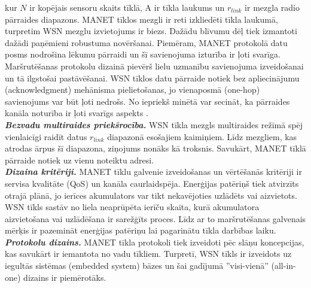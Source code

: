 kur $N$ ir kopējais sensoru skaits tīklā, A ir tīkla laukums un $r_{link}$ ir mezgla radio pārraides diapazons. MANET tīklos mezgli ir reti izkliedēti tīkla laukumā, turpretim WSN mezglu izvietojums ir biezs. Dažādu blīvumu dēļ tiek izmantoti dažādi paņēmieni robustuma novēršanai. Piemēram, MANET protokolā datu posms nodrošina lēkumu pārraidi un šī savienojuma izturība ir ļoti svarīga. Maršrutēšanas protokolu dizainā pievērš lielu uzmanību savienojuma izveidošanai un tā ilgstošai pastāvēšanai. WSN tīklos datu pārraide notiek bez apliecinājumu (acknowledgment) mehānisma pielietošanas, jo vienaposmā (one-hop) savienojums var būt ļoti nedrošs. No iepriekš minētā var secināt, ka pārraides kanāla noturība ir ļoti svarīgs aspekts \cite{20}.\\
\small\textbf{\textit{Bezvadu multiraides priekšrocība.}} WSN tīkla mezgls multiraides režīmā spēj vienlaicīgi raidīt datus $r_{link}$ diapazonā esošajiem kaimiņiem. Līdz mezgliem, kas atrodas ārpus šī diapazona, ziņojums nonāks kā troksnis. Savukārt, MANET tīklā pārraide notiek uz vienu noteiktu adresi.  \\
\small\textbf{\textit{Dizaina kritēriji.}} MANET tīklu galvenie izveidošanas un vērtēšanās kritēriji ir servisa kvalitāte (\acs{QoS}) un kanāla caurlaidspēja. Enerģijas patēriņš tiek atvirzīts otrajā plānā, jo ierīces akumulators var tikt nekavējoties uzlādēts vai aizvietots. WSN tīkls sastāv no liela neaprūpēta ierīču skaita, kurā akumulatora aizvietošana vai uzlādēšana ir sarežģīts proces. Līdz ar to maršrutēšanas galvenais mērķis ir pazemināt enerģijas patēriņu lai pagarinātu tīkla darbības laiku.\\
\small\textbf{\textit{Protokolu dizains.}} MANET tīkla protokoli tiek izveidoti pēc slāņu koncepcijas, kas savukārt ir iemantota no vadu tīkliem. Turpretī, WSN tīkls ir izveidots uz iegultās sistēmas (embedded system) bāzes un šai gadījumā ''visi-vienā'' (all-in-one) dizains ir piemērotāks. \\


